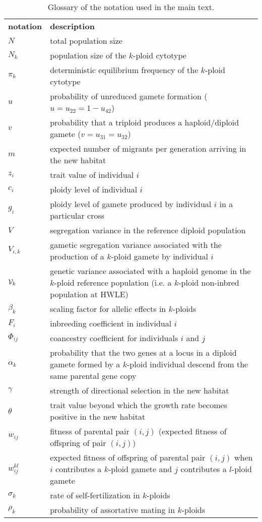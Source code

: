 \documentclass[12pt,a4paper]{article}
\begin{document}
    \begin{table}[t]
    \caption{Glossary of the notation used in the main text.
    } \label{tbl:glossary}
    \centering
    \small
    \begin{tabularx}{\linewidth}{lX}
    \cline{1-2}
    \textbf{notation}   & \textbf{description}   \\ \cline{1-2}
    $N$ & total population size\\
    $N_k$ & population size of the $k$-ploid cytotype \\
    $\pi_k$ & deterministic equilibrium frequency of the $k$-ploid cytotype \\
    $u$ & probability of unreduced gamete formation ($u=u_{22}=1-u_{42}$)\\
    $v$ & probability that a triploid produces a haploid/diploid gamete
      ($v=u_{31}=u_{32}$)\\
    $m$ & expected number of migrants per generation arriving in the new habitat \\
    $z_i$ & trait value of individual $i$ \\
    $c_i$ & ploidy level of individual $i$ \\
    $g_i$ & ploidy level of gamete produced by individual $i$ in a particular cross\\
    $V$ & segregation variance in the reference diploid population \\
    $V_{i,k}$ & gametic segregation variance associated with the production of a
      $k$-ploid gamete by individual $i$ \\
    $\mathcal{V}_k$ & genetic variance associated with a haploid genome in the $k$-ploid
      reference population (i.e. a $k$-ploid non-inbred population at HWLE) \\
    $\beta_{k}$ & scaling factor for allelic effects in $k$-ploids \\
    $F_i$ & inbreeding coefficient in individual $i$ \\
    $\Phi_{ij}$ & coancestry coefficient for individuals $i$ and $j$ \\
    $\alpha_k$ & probability that the two genes at a locus in a diploid gamete
      formed by a $k$-ploid individual descend from the same parental gene copy\\
    $\gamma$ & strength of directional selection in the new habitat\\
    $\theta$ & trait value beyond which the growth rate becomes positive in the new
        habitat \\ 
    $w_{ij}$ & fitness of parental pair $(i,j)$ (expected fitness of
        offspring of pair $(i,j)$)\\
    $w_{ij}^{kl}$ & expected fitness of offspring of parental pair $(i,j)$ when
    $i$ contributes a $k$-ploid gamete and $j$ contributes a $l$-ploid gamete \\
    $\sigma_k$ & rate of self-fertilization in $k$-ploids \\
    $\rho_k$ & probability of assortative mating in $k$-ploids \\
    \cline{1-2}
    \end{tabularx}%
    \end{table}
\end{document}
